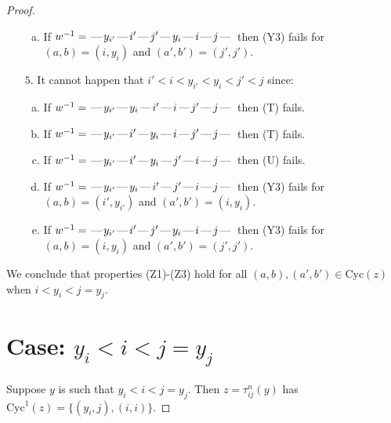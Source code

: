 \documentclass[10pt]{article}
\theoremstyle{definition}
\theoremstyle{definition}
\def\dash{\text{\hspace{0.5mm}---\hspace{0.5mm}}}
\def\Cyc{\mathrm{Cyc}}
\begin{document}
\begin{proof}
\begin{enumerate}
\begin{enumerate}[(a)]
\item If $w^{-1} = \dash y_{i'}\dash i'\dash j'\dash y_i\dash i\dash j\dash $ then (Y3) fails for $(a,b)=(i,y_i)$ and $(a',b')=(j',j')$.
\end{enumerate}
\item[$5$.] It cannot happen that $i' < i < y_{i'} < y_i < j' < j$ since:
\begin{enumerate}[(a)]
\item If $w^{-1} = \dash y_{i'}\dash y_i\dash i'\dash i\dash j'\dash j\dash $ then (T) fails.
\item If $w^{-1} = \dash y_{i'}\dash i'\dash y_i\dash i\dash j'\dash j\dash $ then (T) fails.
\item If $w^{-1} = \dash y_{i'}\dash i'\dash y_i\dash j'\dash i\dash j\dash $ then (U) fails.
\item If $w^{-1} = \dash y_{i'}\dash y_i\dash i'\dash j'\dash i\dash j\dash $ then (Y3) fails for $(a,b)=(i',y_{i'})$ and $(a',b')=(i,y_i)$.
\item If $w^{-1} = \dash y_{i'}\dash i'\dash j'\dash y_i\dash i\dash j\dash $ then (Y3) fails for $(a,b)=(i,y_i)$ and $(a',b')=(j',j')$.
\end{enumerate}
\end{enumerate}
We conclude that properties (Z1)-(Z3) hold for all 
$(a,b),(a',b') \in \Cyc(z)$ when $i < y_i < j = y_j$.
\section{Case: $y_i < i < j = y_j$}
Suppose $y$ is such that $y_i < i < j = y_j$.
Then $z = \tau^n_{ij}(y)$ has $\Cyc^1(z) = \{(y_i,j),(i,i)\}.$

\end{proof}
\end{document}
